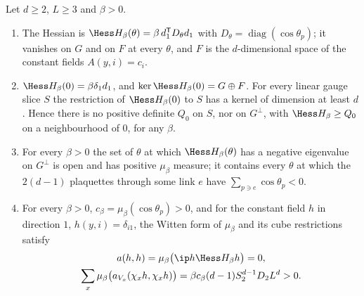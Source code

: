 \begin{proposition}\label{prop:rSwilson}
Let $d\ge2$, $L\ge3$ and $\beta>0$.
\begin{enumerate}[label=\textup{(\roman*)},leftmargin=*]
\item The Hessian is $\Hess H_\beta(\theta)=\beta\,d_1^{\mathsf T}D_\theta
d_1$ with $D_\theta=\operatorname{diag}(\cos\theta_p)$; it vanishes on $G$
and on $F$ at every $\theta$, and $F$ is the $d$-dimensional space of the
constant fields $A(y,i)=c_i$.
\item $\Hess H_\beta(0)=\beta\delta_1d_1$, and $\ker\Hess H_\beta(0)=G\oplus
F$. For every linear gauge slice $S$ the restriction of $\Hess H_\beta(0)$ to
$S$ has a kernel of dimension at least $d$. Hence there is no positive
definite $Q_0$ on $S$, nor on $G^\perp$, with $\Hess H_\beta\ge Q_0$ on a
neighbourhood of $0$, for any $\beta$.
\item For every $\beta>0$ the set of $\theta$ at which $\Hess H_\beta(\theta)$
has a negative eigenvalue on $G^\perp$ is open and has positive $\mu_\beta$
measure; it contains every $\theta$ at which the $2(d-1)$ plaquettes through
some link $e$ have $\sum_{p\ni e}\cos\theta_p<0$.
\item For every $\beta>0$, $c_\beta=\mu_\beta(\cos\theta_p)>0$, and for the
constant field $h$ in direction $1$, $h(y,i)=\delta_{i1}$, the Witten form of
$\mu_\beta$ and its cube restrictions satisfy
\begin{gather*}
a(h,h)=\mu_\beta\bigl(\ip h{\Hess H_\beta h}\bigr)=0,\\
\sum_x\mu_\beta\bigl(a_{V_x}(\chi_xh,\chi_xh)\bigr)=\beta c_\beta(d-1)S_2^{d-1}D_2L^d>0 .
\end{gather*}
\end{enumerate}
\end{proposition}

